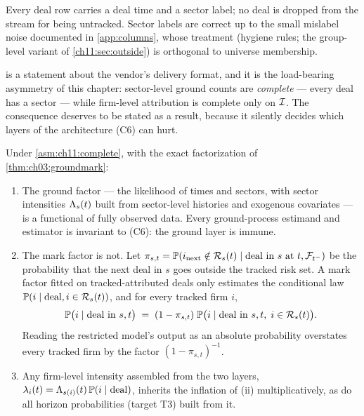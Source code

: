 \begin{assumption}\label{asm:ch11:complete}
Every deal row carries a deal time and a sector label; no deal is dropped
from the stream for being untracked. Sector labels are correct up to the
small mislabel noise documented in \cref{app:columns}, whose treatment
(hygiene rules; the group-level variant of
\cref{ch11:sec:outside}) is orthogonal to universe membership.
\end{assumption}

 is a statement about the vendor's delivery
format, and it is the load-bearing asymmetry of this chapter: sector-level
ground counts are \emph{complete} --- every deal has a sector --- while
firm-level attribution is complete only on $\mathcal{I}$. The consequence
deserves to be stated as a result, because it silently decides which
layers of the architecture (C6) can hurt.

\begin{proposition}\label{prop:ch11:asymmetry}
Under \cref{asm:ch11:complete}, with the exact factorization of
\cref{thm:ch03:groundmark}:
\begin{enumerate}[label=(\roman*)]
\item The ground factor --- the likelihood of times and sectors, with
sector intensities $\Lambda_s(t)$ built from sector-level histories and
exogenous covariates --- is a functional of fully observed data. Every
ground-process estimand and estimator is invariant to (C6): the ground
layer is immune.
\item The mark factor is not. Let $\pi_{s,t} = \mathbb{P}(i_{\text{next}}
\notin \mathcal{R}_s(t) \mid \text{deal in } s \text{ at } t, \mathcal{F}_{t^-})$ be the
probability that the next deal in $s$ goes outside the tracked risk set.
A mark factor fitted on tracked-attributed deals only estimates the
conditional law $\mathbb{P}(i \mid \text{deal}, i \in \mathcal{R}_s(t))$, and for
every tracked firm $i$,
\begin{equation}\label{eq:ch11:inflation}
\mathbb{P}\big(i \mid \mathrm{deal\ in\ } s,t \big)
 \;=\;
 (1 - \pi_{s,t})\;
 \mathbb{P}\big(i \mid \mathrm{deal\ in\ } s,t,\; i \in \mathcal{R}_s(t)\big).
\end{equation}
Reading the restricted model's output as an absolute probability
overstates every tracked firm by the factor $(1-\pi_{s,t})^{-1}$.
\item Any firm-level intensity assembled from the two layers,
$\lambda_i(t) = \Lambda_{s(i)}(t)\,\mathbb{P}(i \mid \mathrm{deal})$, inherits the
inflation of (ii) multiplicatively, as do all horizon probabilities
(target T3) built from it.
\end{enumerate}
\end{proposition}

